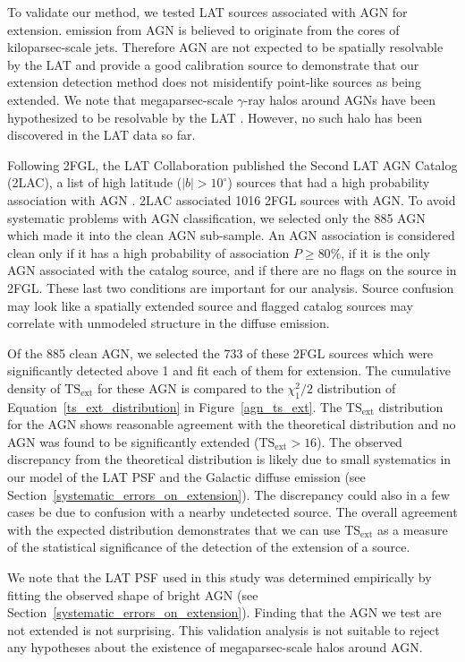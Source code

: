 \documentclass[12pt,preprint]{aastex}
\newcommand{\gev}{\text{GeV}\xspace}
\newcommand{\tsext}{{\ensuremath{\text{TS}_{\text{ext}}}}\xspace}
\newcommand{\degree}{^\circ\xspace}
\begin{document}
To validate our method, we tested LAT sources associated with AGN for
extension.  \gev emission from AGN is believed to originate from the
cores of kiloparsec-scale jets.  Therefore AGN are
not expected to be spatially resolvable by the LAT and provide a good
calibration source to demonstrate that our extension detection method
does not misidentify point-like sources as being extended.  We note that
megaparsec-scale $\gamma$-ray halos around AGNs have been hypothesized
to be resolvable by the LAT \citep{pair_halo_paper}. However, no such
halo has been discovered in the LAT data so far.

Following 2FGL, the LAT Collaboration published the Second LAT AGN
Catalog (2LAC), a list of high latitude ($|b|>10\degree$) sources
that had a high probability association with AGN \citep{second_agn_cat}.
2LAC associated 1016 2FGL sources with AGN.  To avoid systematic problems
with AGN classification, we selected only the 885 AGN which made it into
the clean AGN sub-sample.  An AGN association is considered clean only
if it has a high probability of association $P\ge 80\%$, if it is the
only AGN associated with the catalog source, and if there are no flags
on the source in 2FGL. These last two conditions are important for our
analysis. Source confusion may look like a spatially extended source
and flagged catalog sources may correlate with unmodeled structure in
the diffuse emission.

Of the 885 clean AGN, we selected the 733 of these 2FGL sources which
were significantly detected above 1 \gev and fit each of them for
extension.  The cumulative density of \tsext for these AGN is compared
to the $\chi^2_1/2$ distribution of Equation~\ref{ts_ext_distribution}
in Figure~\ref{agn_ts_ext}.  The \tsext distribution
for the AGN shows reasonable agreement with the theoretical
distribution and no AGN was found to be significantly extended
($\tsext>16$).  The observed discrepancy from the theoretical
distribution is likely due to small systematics
in our model of the LAT PSF and the Galactic diffuse emission (see
Section~\ref{systematic_errors_on_extension}).  The discrepancy could
also in a few cases be due to confusion with a nearby undetected source.
The overall agreement with the expected distribution demonstrates that
we can use \tsext as a measure of the statistical significance of the
detection of the extension of a source.

We note that the LAT PSF used in this study was determined
empirically by fitting the observed shape of bright AGN (see
Section~\ref{systematic_errors_on_extension}). Finding that the AGN we
test are not extended is not surprising.  This validation analysis is
not suitable to reject any hypotheses about the existence of megaparsec-scale
halos around AGN.
\end{document}
